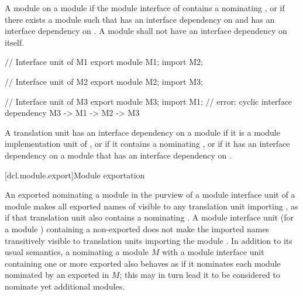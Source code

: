 \begin{std.txt}
  \alinea 
  A module   on a module
   if the module interface of  contains a
   nominating ,
  or if there exists a module  such that  has an
  interface dependency on  and  has an interface dependency
  on .  A module
  shall not have an interface dependency on itself.
  \begin{example}
  \begin{Program}
     // Interface unit of M1
     export module M1;
     import M2;

     // Interface unit of M2
     export module M2;
     import M3;

     // Interface unit of M3
     export module M3;
     import M1;         // error: cyclic interface dependency M3 -> M1 -> M2 -> M3
  \end{Program}
  \end{example}

  \alinea
  A translation unit has an interface dependency on a module  if it is
  a module implementation unit of , or if it contains a
   nominating , or if it has
  an interface dependency on a module that has an interface dependency on .
\end{std.txt}


[dcl.module.export]{Module exportation}%

\begin{std.txt}\color{addclr}
  \resetalinea[0]
  \alinea
  An exported
    nominating a module 
  in the purview of a module interface unit of a module  
  makes all exported names
  of  visible to any translation unit importing , as if
  that translation unit also contains a 
  nominating .
  \enternote
  A module interface unit (for a module ) containing a non-exported
     does not make the imported
    names transitively visible to translation units importing the module
    .
  \exitnote
  In addition to its usual semantics, a 
   nominating a module $M$ with 
  a module interface unit containing one or more exported
   also behaves as if
  it nominates each module nominated by an exported
   in $M$; this may in turn
  lead it to be considered to nominate yet additional modules.
\end{std.txt}


